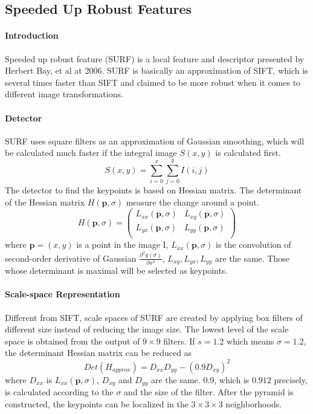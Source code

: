\documentclass[paper=a4, fontsize=11pt]{scrartcl} %
\numberwithin{equation}{section} %
\numberwithin{figure}{section} %
\numberwithin{table}{section} %
\begin{document}

\subsection{Speeded Up Robust Features}

\paragraph{Introduction}
Speeded up robust feature (SURF) is a local feature and descriptor presented by Herbert Bay, et al at 2006. 
SURF is basically an approximation of SIFT, 
which is several times faster than SIFT and claimed to be more robust when it comes to different image transformations.

\paragraph{Detector}
SURF uses square filters as an approximation of Gaussian smoothing, which will be calculated much faster if the integral image $S(x, y)$ is calculated first.
$$
S(x, y) = \sum_{i=0}^x \sum_{j=0}^y I(i, j)
$$
The detector to find the keypoints is based on Hessian matrix. 
The determinant of the Hessian matrix $H(\mathbf{p}, \sigma)$ measure the change around a point. 
$$
H(\mathbf{p}, \sigma) = 
\begin{pmatrix}
L_{xx}(\mathbf{p}, \sigma) & L_{xy}(\mathbf{p}, \sigma) \\ 
L_{yx}(\mathbf{p}, \sigma) & L_{yy}(\mathbf{p}, \sigma) \\ 
\end{pmatrix}
$$
where $\mathbf{p} = (x, y)$ is a point in the image I, 
$L_{xx}(\mathbf{p}, \sigma)$ is the convolution of second-order derivative of Gaussian $ \frac{\partial ^2 g(\sigma)}{\partial x^2} $,
$L_{xy}, L_{yx}, L_{yy}$ are the same.
Those whose determinant is maximal will be selected as keypoints.

\paragraph{Scale-space Representation}
Different from SIFT, scale spaces of SURF are created by applying box filters of different size instead of reducing the image size.
The lowest level of the scale space is obtained from the output of $9 \times 9$ filters. 
If $s = 1.2$ which means $\sigma = 1.2$, the determinant Hessian matrix can be reduced as 
$$
Det(H_{approx}) = D_{xx}D_{yy} - (0.9D_{xy})^2
$$
where $D_{xx}$ is $L_{xx}(\mathbf{p}, \sigma)$, $D_{xy}$ and $D_{yy}$ are the same. 
$0.9$, which is $0.912$ precisely, is calculated according to the $\sigma$ and the size of the filter.
After the pyramid is constructed, the keypoints can be localized in the $3 \times 3 \times 3$ neighborhoods. 
\end{document}
